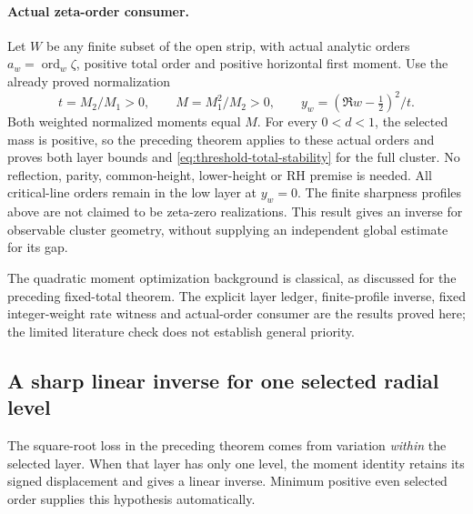 \paragraph{Actual zeta-order consumer.}
Let \(W\) be any finite subset of the open strip, with actual analytic
orders \(a_w=\operatorname{ord}_w\zeta\), positive total order and positive
horizontal first moment.  Use the already proved normalization
\[
 t=M_2/M_1>0,\qquad M=M_1^2/M_2>0,\qquad
 y_w=(\Re w-\tfrac12)^2/t.
\]
Both weighted normalized moments equal \(M\).  For every \(0<d<1\), the
selected mass is positive, so the preceding theorem applies to these
actual orders and proves both layer bounds and
\eqref{eq:threshold-total-stability} for the full cluster.
No reflection, parity, common-height, lower-height or RH premise is needed.
All critical-line orders remain in the low layer at \(y_w=0\).
The finite sharpness profiles above are not claimed to be zeta-zero
realizations.  This result gives an inverse for observable cluster
geometry, without supplying an independent global estimate for its gap.

The quadratic moment optimization background is classical, as discussed
for the preceding fixed-total theorem.  The explicit layer ledger,
finite-profile inverse, fixed integer-weight rate witness and actual-order
consumer are the results proved here; the limited literature check does
not establish general priority.

\subsection{A sharp linear inverse for one selected radial level}
\label{subsec:single-selected-linear}

The square-root loss in the preceding theorem comes from variation
\emph{within} the selected layer.  When that layer has only one level,
the moment identity retains its signed displacement and gives a linear
inverse.  Minimum positive even selected order supplies this hypothesis
automatically.

